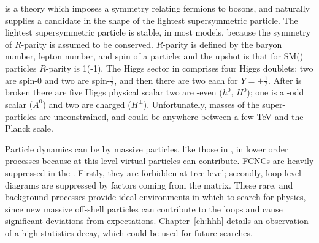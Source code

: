 \SUSY is a theory which imposes a symmetry relating fermions to bosons, and naturally supplies a
\dm candidate in the shape of the lightest supersymmetric
particle.
The lightest supersymmetric particle is stable, in most models, because the symmetry of $R$-parity
is assumed to be conserved.
$R$-parity is  defined by the baryon number, lepton number, and spin of a particle; and the
upshot is that for SM(\SUSY) particles $R$-parity is 1(-1).
The Higgs sector in \SUSY comprises four Higgs doublets; two are spin-0 and two are spin-$\tfrac12$,
and then there are two each for $Y=\pm\tfrac12$.
After \SUSY is broken there are five Higgs physical scalar  two are \CP-even ($h^0$,
$H^0$); one is a \CP-odd scalar ($A^0$) and two are charged ($H^\pm$).
Unfortunately, masses of the super-particles are unconstrained, and could be anywhere between a few
TeV and the Planck scale.


Particle dynamics can be  by massive \np particles, like those in \SUSY, in lower order
processes because at this level virtual particles can contribute.
\glspl{FCNC} are heavily suppressed in the \sm.
Firstly, they are forbidden at tree-level; secondly, loop-level diagrams are suppressed by factors
coming from the \ckm matrix.
These rare, and  background processes provide ideal environments in which to search for \bsm
physics, since new massive off-shell particles can contribute to the loops and cause significant
deviations from \sm expectations.
Chapter~\ref{ch:hhh} details an observation of a high statistics \fcnc decay,
which could be used for future \np searches.




